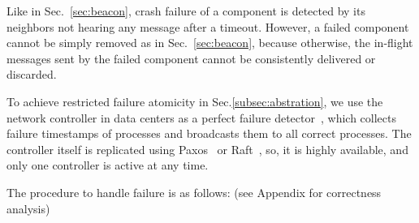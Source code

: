 Like in Sec.~\ref{sec:beacon}, crash failure of a component is detected by its neighbors not hearing any message after a timeout.
However, a failed component cannot be simply removed as in Sec.~\ref{sec:beacon}, because otherwise, the in-flight messages sent by the failed component cannot be consistently delivered or discarded.

To achieve restricted failure atomicity in Sec.\ref{subsec:abstration}, we use the network controller in data centers as a perfect failure detector~\cite{chandra1996unreliable}, which collects failure timestamps of processes and broadcasts them to all correct processes.
The controller itself is replicated using Paxos~\cite{lamport1998part} or Raft~\cite{raft}, so, it is highly available, and only one controller is active at any time.

The procedure to handle failure is as follows: (see Appendix for correctness analysis)

